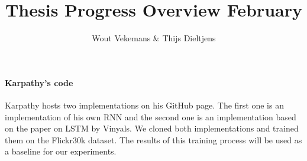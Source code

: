 \documentclass{article}
\title{Thesis Progress Overview February}
\author{Wout Vekemans \& Thijs Dieltjens}
\begin{document}
\maketitle
\paragraph{Karpathy's code}
Karpathy hosts two implementations on his GitHub page. The first one is an implementation of his own RNN and the second one is an implementation based on the paper on LSTM by Vinyals. We cloned both implementations and trained them on the Flickr30k dataset. The results of this training process will be used as a baseline for our experiments.
\end{document}
